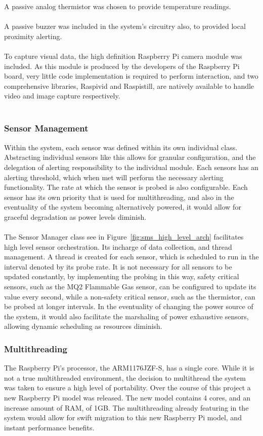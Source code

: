 \documentclass{article}
\begin{document}
A passive analog thermistor was chosen to provide temperature readings. \\\\
A passive buzzer was included in the system’s circuitry also, to provided local proximity alerting. \\\\
To capture visual data, the high definition Raspberry Pi camera module was included. As this module is produced by the developers of the Raspberry Pi board, very little code implementation is required to perform interaction, and two comprehensive libraries, Raspivid and Raspistill,  are natively available to handle video and image capture respectively. \\\\

\subsubsection{Sensor Management}
Within the system, each sensor was defined within its own individual class. Abstracting individual sensors like this allows for granular configuration, and the delegation of alerting responsibility to the individual module. Each sensors has an alerting threshold, which when met will perform the necessary alerting functionality. The rate at which the sensor is probed is also configurable. Each sensor has its own priority that is used for multithreading, and also in the eventuality of the system becoming alternatively powered, it would allow for graceful degradation as power levels diminish. \\\\
The Sensor Manager class see in Figure~\ref{fig:sms_high_level_arch} facilitates high level sensor orchestration. Its incharge of data collection, and thread management. A thread is created for each sensor, which is scheduled to run in the interval denoted by its probe rate. It is not necessary for all sensors to be updated constantly, by implementing the probing in this way, safety critical sensors, such as the MQ2 Flammable Gas sensor, can be configured to update its value every second, while a non-safety critical sensor, such as the thermistor, can be probed at longer intervals. In the eventuality of changing the power source of the system, it would also facilitate the marshaling of power exhaustive sensors, allowing dynamic scheduling as resources diminish. 

\subsubsection{Multithreading}
The Raspberry Pi’s processor, the ARM1176JZF-S, has a single core. While it is not a true multithreaded environment, the decision to multithread the system was taken to ensure a high level of portability. Over the course of this project a new Raspberry Pi model was released. The new model contains 4 cores, and an increase amount of RAM, of 1GB. The multithreading already featuring in the system would allow for swift migration to this new Raspberry Pi model, and instant performance benefits.
\end{document}
